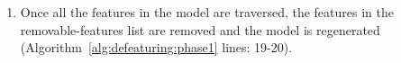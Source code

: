 \begin{enumerate}
\item Once all the features in the model are traversed, the features in the removable-features list are removed and the model is regenerated (Algorithm~\ref{alg:defeaturing:phase1} lines: 19-20).
\end{enumerate}






